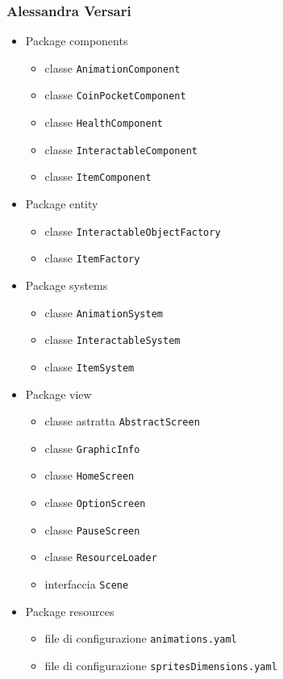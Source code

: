 \documentclass[a4paper,12pt]{report}
\begin{document}
\subsubsection{Alessandra Versari}
\begin{itemize}
	\item Package components
		\begin{itemize}
			\item classe \texttt{AnimationComponent}
			\item classe \texttt{CoinPocketComponent}
			\item classe \texttt{HealthComponent}
			\item classe \texttt{InteractableComponent}
			\item classe \texttt{ItemComponent}
		\end{itemize}
	\item Package entity
		\begin{itemize}
			\item classe \texttt{InteractableObjectFactory}
			\item classe \texttt{ItemFactory}
		\end{itemize}
	\item Package systems
		\begin{itemize}
			\item classe \texttt{AnimationSystem}
			\item classe \texttt{InteractableSystem}
			\item classe \texttt{ItemSystem}
		\end{itemize}
	\item Package view
		\begin{itemize}
			\item classe astratta \texttt{AbstractScreen}
			\item classe \texttt{GraphicInfo}
			\item classe \texttt{HomeScreen}
			\item classe \texttt{OptionScreen}
			\item classe \texttt{PauseScreen}
			\item classe \texttt{ResourceLoader}
			\item interfaccia \texttt{Scene}
		\end{itemize}
	\item Package resources
		\begin{itemize}
			\item file di configurazione \texttt{animations.yaml}
			\item file di configurazione \texttt{spritesDimensions.yaml}
		\end{itemize}
	\end{itemize}
\end{document}
